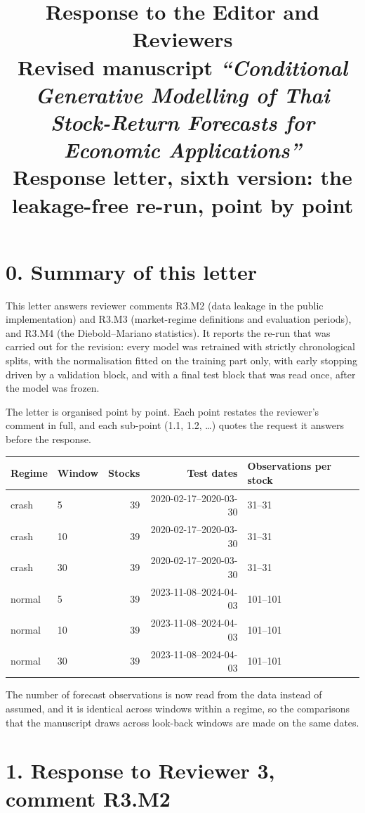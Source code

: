 \documentclass[11pt,a4paper]{article}
\title{\vspace{-2.2cm}\textbf{Response to the Editor and Reviewers}\\[0.35em]
  \large Revised manuscript \emph{``Conditional Generative Modelling of Thai Stock-Return Forecasts for Economic Applications''}\\[0.6em]
  \normalsize Response letter, sixth version: the leakage-free re-run, point by point}
\author{}
\date{}
\begin{document}
\maketitle

\section*{0. Summary of this letter}

This letter answers reviewer comments R3.M2 (data leakage in the public
implementation) and R3.M3 (market-regime definitions and evaluation
periods), and R3.M4 (the Diebold--Mariano statistics). It reports the
re-run that was carried out for
the revision: every model was retrained with strictly chronological splits,
with the normalisation fitted on the training part only, with early stopping
driven by a validation block, and with a final test block that was read
once, after the model was frozen.

The letter is organised point by point. Each point restates the
reviewer's comment in full, and each sub-point (1.1, 1.2, \dots) quotes the
request it answers before the response.

\begin{center}\small
\begin{tabular}{llrrl}
\toprule
Regime & Window & Stocks & Test dates & Observations per stock \\
\midrule
crash & 5 & 39 & 2020-02-17--2020-03-30 & 31--31 \\
crash & 10 & 39 & 2020-02-17--2020-03-30 & 31--31 \\
crash & 30 & 39 & 2020-02-17--2020-03-30 & 31--31 \\
normal & 5 & 39 & 2023-11-08--2024-04-03 & 101--101 \\
normal & 10 & 39 & 2023-11-08--2024-04-03 & 101--101 \\
normal & 30 & 39 & 2023-11-08--2024-04-03 & 101--101 \\
\bottomrule
\end{tabular}
\end{center}

The number of forecast observations is now read from the data instead of
assumed, and it is identical across windows within a regime, so the
comparisons that the manuscript draws across look-back windows are made
on the same dates.

\section*{1. Response to Reviewer 3, comment R3.M2}
\end{document}
